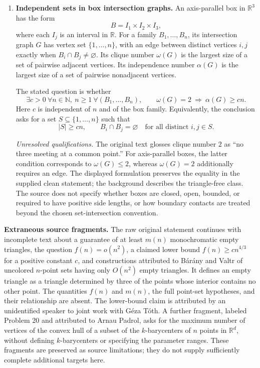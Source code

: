 \documentclass[11pt]{article}
\newcommand{\N}{\mathbb{N}}
\newcommand{\R}{\mathbb{R}}
\begin{document}
\begin{enumerate}
\item \textbf{Independent sets in box intersection graphs.} An axis-parallel box in \(\R^3\) has the form
\[
B=I_1\times I_2\times I_3,
\]
where each \(I_j\) is an interval in \(\R\). For a family \(B_1,\ldots,B_n\), its intersection graph \(G\) has vertex set \(\{1,\ldots,n\}\), with an edge between distinct vertices \(i,j\) exactly when \(B_i\cap B_j\neq\varnothing\). Its clique number \(\omega(G)\) is the largest size of a set of pairwise adjacent vertices. Its independence number \(\alpha(G)\) is the largest size of a set of pairwise nonadjacent vertices.

The stated question is whether
\[
\exists c>0\ \forall n\in\N,\ n\geq1\ \forall(B_1,\ldots,B_n),
\qquad
\omega(G)=2\ \Longrightarrow\ \alpha(G)\geq cn.
\]
Here \(c\) is independent of \(n\) and of the box family. Equivalently, the conclusion asks for a set \(S\subseteq\{1,\ldots,n\}\) such that
\[
|S|\geq cn,
\qquad B_i\cap B_j=\varnothing\quad\text{for all distinct }i,j\in S.
\]

\emph{Unresolved qualifications.} The original text glosses clique number \(2\) as ``no three meeting at a common point.'' For axis-parallel boxes, the latter condition corresponds to \(\omega(G)\leq2\), whereas \(\omega(G)=2\) additionally requires an edge. The displayed formulation preserves the equality in the supplied clean statement; the background describes the triangle-free class. The source does not specify whether boxes are closed, open, bounded, or required to have positive side lengths, or how boundary contacts are treated beyond the chosen set-intersection convention.
\end{enumerate}

\textbf{Extraneous source fragments.} The raw original statement continues with incomplete text about a guarantee of at least \(m(n)\) monochromatic empty triangles, the question \(f(n)=o(n^2)\), a claimed lower bound \(f(n)\geq cn^{4/3}\) for a positive constant \(c\), and constructions attributed to B\'ar\'any and Valtr of uncolored \(n\)-point sets having only \(O(n^2)\) empty triangles. It defines an empty triangle as a triangle determined by three of the points whose interior contains no other point. The quantities \(f(n)\) and \(m(n)\), the full point-set hypotheses, and their relationship are absent. The lower-bound claim is attributed by an unidentified speaker to joint work with G\'eza T\'oth. A further fragment, labeled Problem 20 and attributed to Arnau Padrol, asks for the maximum number of vertices of the convex hull of a subset of the \(k\)-barycenters of \(n\) points in \(\R^d\), without defining \(k\)-barycenters or specifying the parameter ranges. These fragments are preserved as source limitations; they do not supply sufficiently complete additional targets here.
\end{document}
